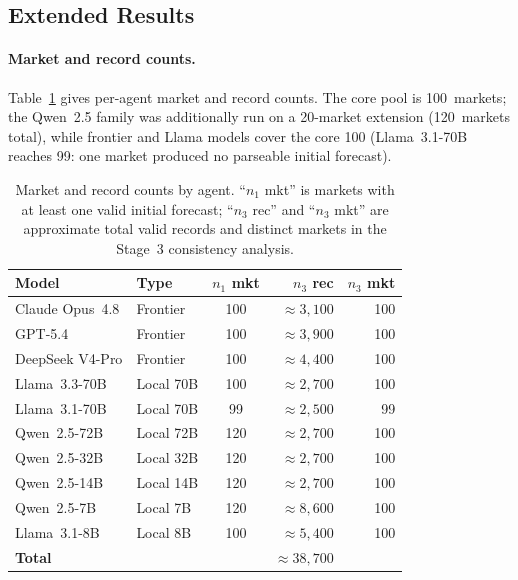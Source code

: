 \documentclass{article} %
\begin{document}
\subsection{Extended Results}
\label{app:extended-results}

\paragraph{Market and record counts.}
Table~\ref{tab:model-summary} gives per-agent market and record counts.  The core pool is
100~markets; the Qwen~2.5 family was additionally run on a 20-market extension
(120~markets total), while frontier and Llama models cover the core 100
(Llama~3.1-70B reaches 99: one market produced no parseable initial forecast).

\begin{table}[h]
\centering
\caption{Market and record counts by agent.  ``$n_1$ mkt'' is markets with at least one
valid initial forecast; ``$n_3$ rec'' and ``$n_3$ mkt'' are approximate total valid
records and distinct markets in the Stage~3 consistency analysis.}
\label{tab:model-summary}
\small
\begin{tabular}{llcrr}
\toprule
\textbf{Model} & \textbf{Type}
  & \textbf{$n_1$ mkt} & \textbf{$n_3$ rec} & \textbf{$n_3$ mkt} \\
\midrule
Claude Opus~4.8 & Frontier  & 100 & ${\approx}3{,}100$ & 100 \\
GPT-5.4         & Frontier  & 100 & ${\approx}3{,}900$ & 100 \\
DeepSeek V4-Pro & Frontier  & 100 & ${\approx}4{,}400$ & 100 \\
Llama~3.3-70B   & Local 70B & 100 & ${\approx}2{,}700$ & 100 \\
Llama~3.1-70B   & Local 70B &  99 & ${\approx}2{,}500$ &  99 \\
Qwen~2.5-72B    & Local 72B & 120 & ${\approx}2{,}700$ & 100 \\
Qwen~2.5-32B    & Local 32B & 120 & ${\approx}2{,}700$ & 100 \\
Qwen~2.5-14B    & Local 14B & 120 & ${\approx}2{,}700$ & 100 \\
Qwen~2.5-7B     & Local 7B  & 120 & ${\approx}8{,}600$ & 100 \\
Llama~3.1-8B    & Local 8B  & 100 & ${\approx}5{,}400$ & 100 \\
\midrule
\textbf{Total}  &           &     & ${\approx}38{,}700$ & \\
\bottomrule
\end{tabular}
\end{table}
\end{document}
